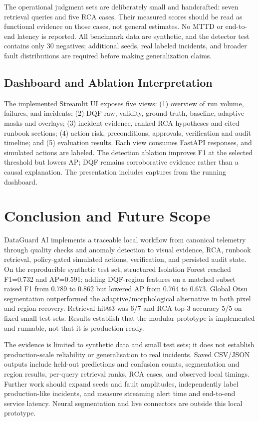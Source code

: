 \documentclass[conference]{IEEEtran}
\begin{document}
The operational judgment sets are deliberately small and handcrafted: seven retrieval queries and five RCA cases. Their measured scores should be read as functional evidence on those cases, not general estimates. No MTTD or end-to-end latency is reported. All benchmark data are synthetic, and the detector test contains only 30 negatives; additional seeds, real labeled incidents, and broader fault distributions are required before making generalization claims.

\subsection{Dashboard and Ablation Interpretation}
The implemented Streamlit UI exposes five views: (1) overview of run volume, failures, and incidents; (2) DQF raw, validity, ground-truth, baseline, adaptive masks and overlays; (3) incident evidence, ranked RCA hypotheses and cited runbook sections; (4) action risk, preconditions, approvals, verification and audit timeline; and (5) evaluation results. Each view consumes FastAPI responses, and simulated actions are labeled. The detection ablation improves F1 at the selected threshold but lowers AP; DQF remains corroborative evidence rather than a causal explanation. The presentation includes captures from the running dashboard.

\section{Conclusion and Future Scope}
DataGuard AI implements a traceable local workflow from canonical telemetry through quality checks and anomaly detection to visual evidence, RCA, runbook retrieval, policy-gated simulated actions, verification, and persisted audit state. On the reproducible synthetic test set, structured Isolation Forest reached F1=0.732 and AP=0.591; adding DQF-region features on a matched subset raised F1 from 0.789 to 0.862 but lowered AP from 0.764 to 0.673. Global Otsu segmentation outperformed the adaptive/morphological alternative in both pixel and region recovery. Retrieval hit@3 was 6/7 and RCA top-3 accuracy 5/5 on fixed small test sets. Results establish that the modular prototype is implemented and runnable, not that it is production ready.

The evidence is limited to synthetic data and small test sets; it does not establish production-scale reliability or generalisation to real incidents. Saved CSV/JSON outputs include held-out predictions and confusion counts, segmentation and region results, per-query retrieval ranks, RCA cases, and observed local timings. Further work should expand seeds and fault amplitudes, independently label production-like incidents, and measure streaming alert time and end-to-end service latency. Neural segmentation and live connectors are outside this local prototype.
\end{document}
